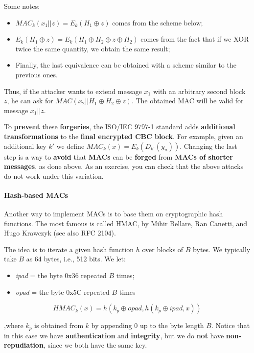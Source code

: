 Some notes:

\begin{itemize}
    \item $\mathit{MAC}_k(x_1 || z) = E_k(H_1 \oplus z)$ comes from the scheme below;


    \item $E_k(H_1 \oplus z) = E_k(H_1 \oplus H_2 \oplus z \oplus H_2)$ comes from the fact that if we XOR twice the same quantity, we obtain the same result;
    \item Finally, the last equivalence can be obtained with a scheme similar to the previous ones.
\end{itemize}

Thus, if the attacker wants to extend message $x_1$ with an arbitrary second block $z$, he can ask for $\mathit{MAC}(x_2||H_1 \oplus H_2 \oplus z)$. The obtained MAC will be valid for message $x_1 || z$.

To \textbf{prevent} these \textbf{forgeries}, the ISO/IEC 9797-1 standard adds \textbf{additional transformations} to the \textbf{final encrypted CBC block}. For example, given an additional key $k'$ we define $\mathit{MAC}_k(x) = E_k(D_{k'}(y_n))$. Changing the last step is a way to \textbf{avoid} that \textbf{MACs} can be \textbf{forged} from \textbf{MACs of shorter messages}, as done above. As an exercise, you can check that the above attacks do not work under this variation.

\paragraph{Hash-based MACs} Another way to implement MACs is to base them on cryptographic hash functions. The most famous is called HMAC, by Mihir Bellare, Ran Canetti, and Hugo Krawczyk (see also RFC 2104).

The idea is to iterate a given hash function $h$ over blocks of $B$ bytes. We typically take $B$ as 64 bytes, i.e., 512 bits. We let:

\begin{itemize}
    \item \textit{ipad} = the byte 0x36 repeated $B$ times;
    \item \textit{opad} = the byte 0x5C repeated $B$ times
\end{itemize}


$$\mathit{HMAC}_k(x) = h(k_p \oplus opad, h(k_p \oplus ipad, x))$$

,where $k_p$ is obtained from $k$ by appending 0 up to the byte length $B$. Notice that in this case we have \textbf{authentication} and \textbf{integrity}, but we do \textbf{not} have \textbf{non-repudiation}, since we both have the same key.

